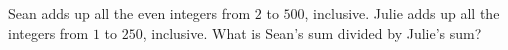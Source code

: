 Sean adds up all the even integers from $2$ to $500$, inclusive. Julie adds up all the integers from $1$ to $250$, inclusive. What is Sean's sum divided by Julie's sum?

